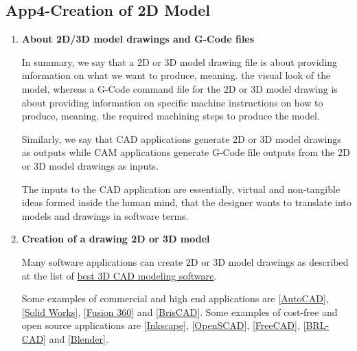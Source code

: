 \subsection{App4-Creation of 2D Model}\label{sec:App4-Creation of 2D Model}

\begin{enumerate}
	
\item \textbf{About 2D/3D model drawings and G-Code files}

In summary, we say that a 2D or 3D model drawing file is about providing information on what we want to produce, meaning. the visual look of the model, whereas a G-Code command file for the 2D or 3D model drawing is about providing information on specific machine instructions on how to produce, meaning, the required machining steps to produce the model.

Similarly, we say that CAD applications generate 2D or 3D model drawings as outputs while CAM applications generate G-Code file outputs from the 2D or 3D model drawings as inputs.

The inputs to the CAD application are essentially, virtual and non-tangible ideas formed inside the human mind, that the designer wants to translate into models and drawings in software terms. 

\item \textbf{Creation of a drawing 2D or 3D model}

Many software applications can create 2D or 3D model drawings as described at the list of  \href{https://www.pannam.com/blog/best-3d-cad-modeling-software/}{best 3D CAD modeling software}. 

Some examples of commercial and high end applications are [\href{http://www.autodesk.com/products/autocad/overview}{AutoCAD}],
[\href{http://www.solidworks.com/sw/products/3d-cad/packages.htm}{Solid Works}],
[\href{http://www.autodesk.com/products/fusion-360/overview}{Fusion 360}] and
[\href{https://www.bricsys.com/en\_INTL/bricscad/D}{BrisCAD}]. Some examples of cost-free and open source applications are [\href{https://inkscape.org/}{Inkscape}],
[\href{http://www.openscad.org/}{OpenSCAD}], 
[\href{https://www.freecadweb.org/}{FreeCAD}],
[\href{https://brlcad.org/}{BRL-CAD}] and 
[\href{https://www.blender.org/}{Blender}].



\end{enumerate}
